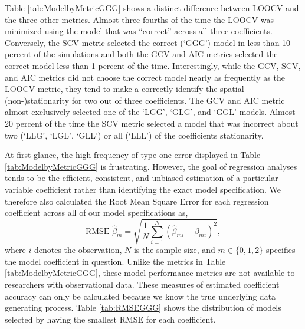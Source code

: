 \documentclass{article}\usepackage[]{graphicx}\usepackage[]{color}
\begin{document}
Table \ref{tab:ModelbyMetricGGG} shows a distinct difference between LOOCV and the three other metrics. Almost three-fourths of the time the LOOCV was minimized using the model that was ``correct'' across all three coefficients. Conversely, the SCV metric selected the correct (`GGG') model in less than 10 percent of the simulations and both the GCV and AIC metrics selected the correct model less than 1 percent of the time. Interestingly, while the GCV, SCV, and AIC metrics did not choose the correct model nearly as frequently as the LOOCV metric, they tend to make a correctly identify the spatial (non-)stationarity for two out of three coefficients. The GCV and AIC metric almost exclusively selected one of the `LGG', `GLG', and `GGL' models. Almost 20 percent of the time the SCV metric selected a model that was incorrect about two (`LLG', `LGL', `GLL') or all (`LLL') of the coefficients stationarity.

At first glance, the high frequency of type one error displayed in Table \ref{tab:ModelbyMetricGGG} is frustrating. However, the goal of regression analyses tends to be the efficient, consistent, and unbiased estimation of a particular variable coefficient rather than identifying the exact model specification. We therefore also calculated the Root Mean Square Error for each regression coefficient across all of our model specifications as,
\begin{equation}
\textrm{RMSE } \widehat{\beta} _m = \sqrt{\frac{1}{N} \sum _{i=1}^N (\widehat{\beta} _{mi} - \beta _{mi})^2},   
\end{equation}
where $i$ denotes the observation, $N$ is the sample size, and $m \in \{0, 1, 2\}$ specifies the model coefficient in question.  Unlike the metrics in Table \ref{tab:ModelbyMetricGGG}, these model performance metrics are not available to researchers with observational data. These measures of estimated coefficient accuracy can only be calculated because we know the true underlying data generating process. Table \ref{tab:RMSEGGG} shows the distribution of models selected by having the smallest RMSE for each coefficient. 
\end{document}
